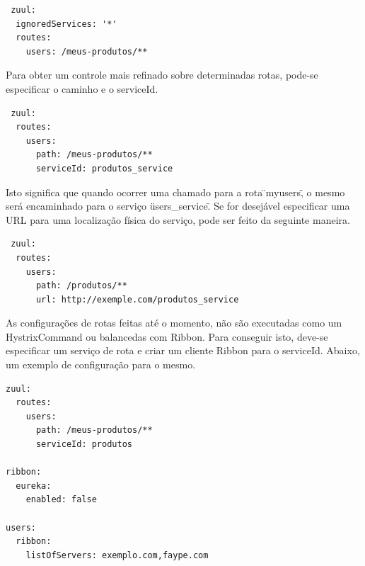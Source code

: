 \begin{verbatim}
 zuul:
  ignoredServices: '*'
  routes:
    users: /meus-produtos/**
\end{verbatim}

Para obter um controle mais refinado sobre determinadas rotas, pode-se especificar o caminho e o serviceId.

\begin{verbatim}
 zuul:
  routes:
    users:
      path: /meus-produtos/**
      serviceId: produtos_service
\end{verbatim}

Isto significa que quando ocorrer uma chamado para a rota \"\/myusers\", o mesmo será encaminhado para o serviço \"users_service\". Se for desejável especificar uma URL para uma localização física do serviço, pode ser feito da seguinte maneira.

\begin{verbatim}
 zuul:
  routes:
    users:
      path: /produtos/**
      url: http://exemple.com/produtos_service
\end{verbatim}

As configurações de rotas feitas até o momento, não são executadas como um HystrixCommand ou balancedas com Ribbon. Para conseguir isto, deve-se especificar um serviço de rota e criar um cliente Ribbon para o serviceId. Abaixo, um exemplo de configuração para o mesmo.

\begin{verbatim}
zuul:
  routes:
    users:
      path: /meus-produtos/**
      serviceId: produtos

ribbon:
  eureka:
    enabled: false

users:
  ribbon:
    listOfServers: exemplo.com,faype.com
\end{verbatim}


